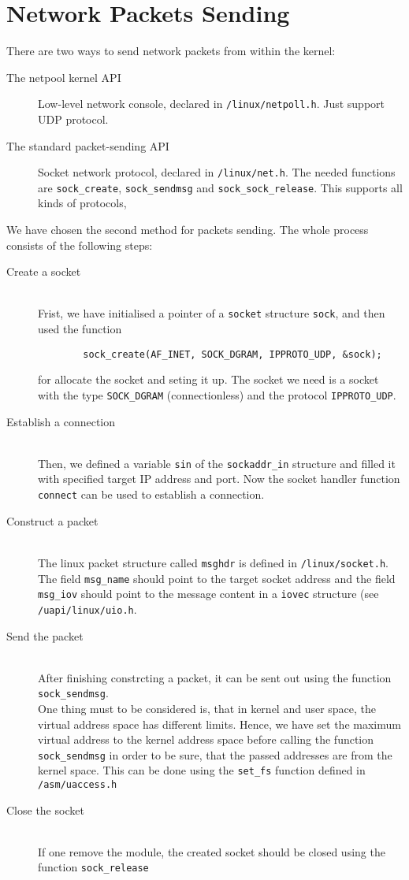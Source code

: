 \section{Network Packets Sending}
There are two ways to send network packets from within the kernel:
\begin{description}
	\item[The netpool kernel API] Low-level network console, declared in \verb+/linux/netpoll.h+. Just support UDP protocol.
	\item[The standard packet-sending API] Socket network protocol, declared in \verb+/linux/net.h+. The needed functions are \texttt{sock\_create}, \texttt{sock\_sendmsg} and \texttt{sock\_sock\_release}. This supports all kinds of protocols, 
\end{description}
We have chosen the second method for packets sending. The whole process consists of the following steps:
\begin{description}
	\item[Create a socket]\hfill \\
	Frist, we have initialised a pointer of a \texttt{socket} structure \texttt{sock}, and then used the function
\begin{center}
\lstset{escapechar=,style=customc}
	\begin{lstlisting}
		sock_create(AF_INET, SOCK_DGRAM, IPPROTO_UDP, &sock);
	\end{lstlisting}
\end{center}
for allocate the socket and seting it up. The socket we need is a socket with the type \texttt{SOCK\_DGRAM} (connectionless) and the protocol \texttt{IPPROTO\_UDP}.
  \item[Establish a connection] \hfill\\
	Then, we defined a variable \texttt{sin} of the \texttt{sockaddr\_in} structure and filled it with specified target IP address and port. Now the socket handler function \texttt{connect} can be used to establish a connection.
	\item[Construct a packet] \hfill \\
The linux packet structure called \texttt{msghdr} is defined in \verb+/linux/socket.h+. The field \texttt{msg\_name} should point to the target socket address and the field \texttt{msg\_iov} should point to the message content in a \texttt{iovec} structure (see \verb+/uapi/linux/uio.h+. 
	\item[Send the packet] \hfill \\
	After finishing constrcting a packet, it can be sent out using the function \texttt{sock\_sendmsg}. \\
	One thing must to be considered is, that in kernel and user space, the virtual address space has different limits. Hence, we have set the maximum virtual address to the kernel address space before calling the function \texttt{sock\_sendmsg} in order to be sure, that the passed addresses are from the kernel space. This can be done using the \texttt{set\_fs} function defined in \verb+/asm/uaccess.h+
	\item[Close the socket] \hfill \\
	If one remove the module, the created socket should be closed using the function \texttt{sock\_release}
\end{description}
